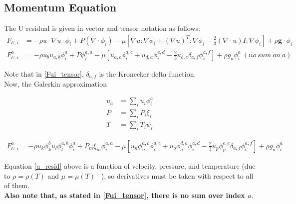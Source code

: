 \subsection{Momentum Equation}
The U residual is given in vector and tensor notation as follows:
\begin{align}
    F_{U,i} &= -\rho u \cdot \nabla u \cdot \phi_i + P(\nabla \cdot \phi_i) - \mu \left [\nabla u : \nabla \phi_i + (\nabla u)^T : \nabla \phi_i - \frac{2}{3} (\nabla \cdot u) I : \nabla \phi_i \right ] + \rho \mathbf{g} \cdot \phi_i \\
    F_{U,i}^a &= -\rho u_b u_{a,b} \phi_i^a + P\phi_i^{a,a} - \mu \left [u_{a,c} \phi_i^{a,c} + u_{d,a} \phi_i^{a,d} - \frac{2}{3} u_{e,e} \delta_{a,f} \phi_i^{a,f} \right ] + \rho g_a \phi_i^a \ (no \ sum \ on \ a) \label{Fui_tensor}
\end{align}

Note that in \ref{Fui_tensor}, $\delta_{a,f}$ is the Kronecker delta function. \\

Now, the Galerkin approximation

\begin{align*}
    u_a &= \sum_i u_i \phi_i^a\\
    P &= \sum_i P_i \xi_i\\
    T &= \sum_i T_i \psi_i
\end{align*}

\begin{align}
    F_{U,i}^a =  -\rho u_k \phi_k^b u_l \phi_l^{a,b} \phi_i^a + P_m \xi_m \phi_i^{a,a} - \mu \left [u_n \phi_n^{a,c} \phi_i^{a,c} + u_o \phi_o^{d,a} \phi_i^{a,d} - \frac{2}{3} u_p \phi_p^{e,e} \delta_{a,f} \phi_i^{a,f} \right ] + \rho g_a \phi_i^a \label{u_resid}
\end{align}

Equation \ref{u_resid} above is a function of velocity, pressure, and temperature (due to $\rho = \rho(T)$ and $\mu = \mu(T)$ \ ), so derivatives must be taken with respect to all of them.\\
\textbf{Also note that, as stated in \ref{Fui_tensor}, there is no sum over index $a$}.


